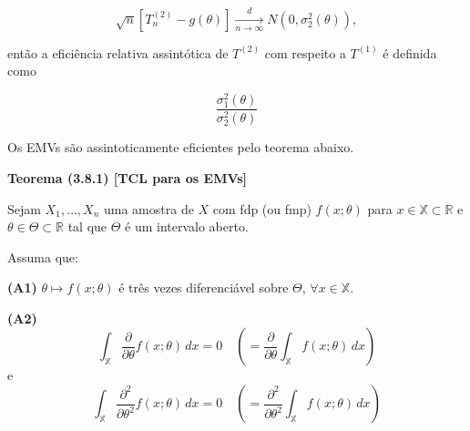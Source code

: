 \begin{equation}
\sqrt{n} \left[ T_n^{(2)} - g(\theta) \right] \xrightarrow[n \to \infty]{d} N\left(0, \sigma_2^2(\theta)\right),
\end{equation}

então a eficiência relativa assintótica de $T^{(2)}$ com respeito a $T^{(1)}$ é definida como

\begin{equation}
\frac{\sigma_1^2(\theta)}{\sigma_2^2(\theta)}
\end{equation}

Os EMVs são assintoticamente eficientes pelo teorema abaixo.

\textbf{Teorema (3.8.1) [TCL para os EMVs]}

Sejam $X_1, \ldots, X_n$ uma amostra de $X$ com fdp (ou fmp) $f(x; \theta)$ para $x \in \mathbb{X} \subset \mathbb{R}$ e $\theta \in \Theta \subset \mathbb{R}$ tal que $\Theta$ é um intervalo aberto.

Assuma que:

\textbf{(A1)} $\theta \mapsto f(x; \theta)$ é três vezes diferenciável sobre $\Theta$, $\forall x \in \mathbb{X}$.

\textbf{(A2)} 
\begin{equation}
\int_{\mathbb{X}} \frac{\partial}{\partial \theta} f(x; \theta) \, dx = 0 \quad \left( = \frac{\partial}{\partial \theta} \int_{\mathbb{X}} f(x; \theta) \, dx \right)
\end{equation}
e
\begin{equation}
\int_{\mathbb{X}} \frac{\partial^2}{\partial \theta^2} f(x; \theta) \, dx = 0 \quad \left( = \frac{\partial^2}{\partial \theta^2} \int_{\mathbb{X}} f(x; \theta) \, dx \right)
\end{equation}